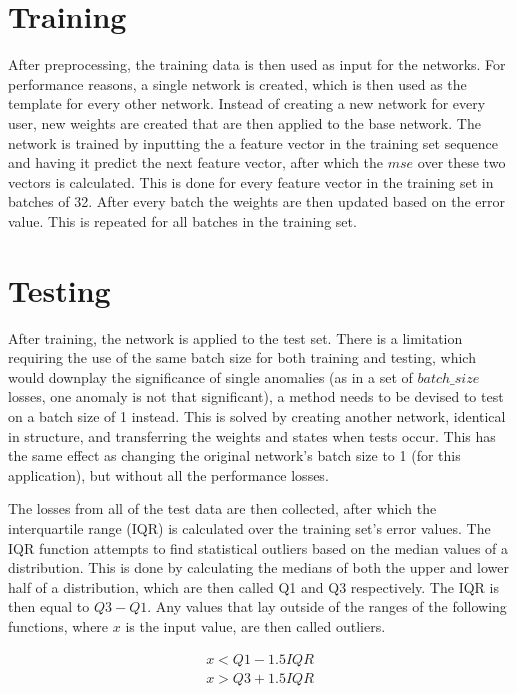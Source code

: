 \section{Training}
After preprocessing, the training data is then used as input for the networks. For performance reasons, a single network is created, which is then used as the template for every other network. Instead of creating a new network for every user, new weights are created that are then applied to the base network. The network is trained by inputting the a feature vector in the training set sequence and having it predict the next feature vector, after which the \(mse\) over these two vectors is calculated. This is done for every feature vector in the training set in batches of 32. After every batch the weights are then updated based on the error value. This is repeated for all batches in the training set.

\section{Testing}\label{sec:methods:testing}
After training, the network is applied to the test set. There is a limitation requiring the use of the same batch size for both training and testing, which would downplay the significance of single anomalies (as in a set of \(batch\_size\) losses, one anomaly is not that significant), a method needs to be devised to test on a batch size of 1 instead. This is solved by creating another network, identical in structure, and transferring the weights and states when tests occur. This has the same effect as changing the original network's batch size to 1 (for this application), but without all the performance losses.

The losses from all of the test data are then collected, after which the interquartile range (IQR) is calculated over the training set's error values. The IQR function attempts to find statistical outliers based on the median values of a distribution. This is done by calculating the medians of both the upper and lower half of a distribution, which are then called Q1 and Q3 respectively. The IQR is then equal to \(Q3 - Q1\). Any values that lay outside of the ranges of the following functions, where \(x\) is the input value, are then called outliers.

\begin{subequations}
\begin{align}
	x < Q1 - 1.5 IQR \label{iqr_min} \\
	x > Q3 + 1.5 IQR \label{iqr_max}
\end{align}
\end{subequations}

